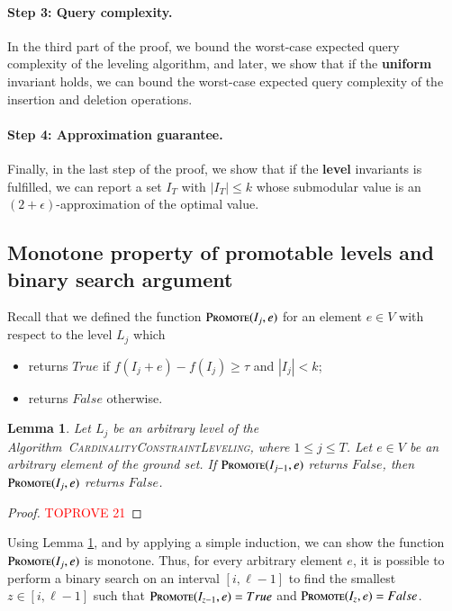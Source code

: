 \documentclass[11pt]{article}
\newtheorem{lemma}[theorem]{Lemma}
\newcommand{\suit}{\textsc{Promote}}
\newcommand{\levelingconstraint}{\textsc{CardinalityConstraintLeveling}}
\newcommand{\marginalgain}[2]{f(#2 + #1) - f(#2)}
\begin{document}
\paragraph{Step 3: Query complexity.}
In the third part of the proof, we bound 
the worst-case expected  query complexity of the leveling algorithm, and later,  we show that if the \textbf{uniform} invariant holds, we can bound the worst-case expected query complexity of the insertion and deletion operations. 

\paragraph{Step 4: Approximation guarantee.}
Finally, in the last step of the proof, we show that if the \textbf{level} invariants 
is fulfilled, we can report a set $I_T$ with $|I_T|\le k$ 
whose submodular value is an $(2+\epsilon)$-approximation of the optimal value. 


\subsection{Monotone property of promotable levels and binary search argument}
Recall that we defined the function 
$\suit(I_j, e)$ for an element $e \in V$ 
with respect to the level $L_j$ which 
\begin{itemize}
    \item returns $True$ if $\marginalgain{e}{I_j} \ge \tau$  and  $|I_j| < k$;
    \item returns $False$ otherwise.
\end{itemize}

\begin{lemma}
\label{lm:cardinality:binary_search_argument}
Let $L_j$ be an arbitrary level of the Algorithm~\levelingconstraint{}, where $1 \le j \le T$. 
Let $e \in V$ be an arbitrary element of the ground set. 
If $\suit(I_{j-1}, e)$ returns $False$, then 
$\suit(I_j, e)$ returns $False$. 
\end{lemma}   

\begin{proof}\textcolor{red}{TOPROVE 21}\end{proof}

Using Lemma \ref{lm:cardinality:binary_search_argument}, and by applying a simple induction, 
we can show the function $\suit(I_j, e)$ 
is monotone.
Thus, for every arbitrary element $e$, 
it is possible to perform a binary search on an interval $[i, \ell-1]$ 
to find the smallest $z\in [i, \ell-1]$ such that $\suit(I_{z-1}, e) = True$ and $\suit(I_z, e) = False$.
\end{document}

